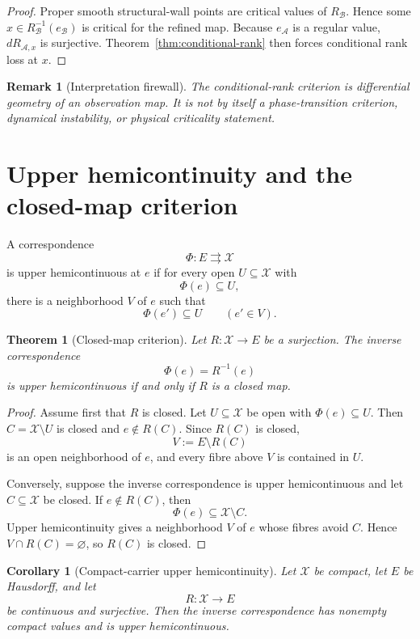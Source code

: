 \documentclass[11pt]{article}
\newtheorem{theorem}[definition]{Theorem}
\newtheorem{corollary}[definition]{Corollary}
\newtheorem{remark}[definition]{Remark}
\newcommand{\X}{\mathcal X}
\newcommand{\Acal}{\mathcal A}
\newcommand{\Bcal}{\mathcal B}
\begin{document}
\begin{proof}
Proper smooth structural-wall points are critical values of
\(R_{\Bcal}\). Hence some
\(x\in R_{\Bcal}^{-1}(e_{\Bcal})\) is critical for the refined map.
Because \(e_{\Acal}\) is a regular value, \(dR_{\Acal,x}\) is
surjective. Theorem~\ref{thm:conditional-rank} then forces conditional
rank loss at \(x\).
\end{proof}

\begin{remark}[Interpretation firewall]
The conditional-rank criterion is differential geometry of an observation
map. It is not by itself a phase-transition criterion, dynamical instability,
or physical criticality statement.
\end{remark}

\section{Upper hemicontinuity and the closed-map criterion}

A correspondence
\[
\Phi:E\rightrightarrows\X
\]
is upper hemicontinuous at \(e\) if for every open \(U\subseteq\X\) with
\[
\Phi(e)\subseteq U,
\]
there is a neighborhood \(V\) of \(e\) such that
\[
\Phi(e')\subseteq U
\qquad(e'\in V).
\]

\begin{theorem}[Closed-map criterion]
\label{thm:closed-map}
Let \(R:\X\to E\) be a surjection. The inverse correspondence
\[
\Phi(e)=R^{-1}(e)
\]
is upper hemicontinuous if and only if \(R\) is a closed map.
\end{theorem}

\begin{proof}
Assume first that \(R\) is closed. Let \(U\subseteq\X\) be open with
\(\Phi(e)\subseteq U\). Then \(C=\X\setminus U\) is closed and
\(e\notin R(C)\). Since \(R(C)\) is closed,
\[
V:=E\setminus R(C)
\]
is an open neighborhood of \(e\), and every fibre above \(V\) is contained
in \(U\).

Conversely, suppose the inverse correspondence is upper hemicontinuous and let
\(C\subseteq\X\) be closed. If \(e\notin R(C)\), then
\[
\Phi(e)\subseteq\X\setminus C.
\]
Upper hemicontinuity gives a neighborhood \(V\) of \(e\) whose fibres avoid
\(C\). Hence \(V\cap R(C)=\varnothing\), so \(R(C)\) is closed.
\end{proof}

\begin{corollary}[Compact-carrier upper hemicontinuity]
\label{thm:uhc}
Let \(\X\) be compact, let \(E\) be Hausdorff, and let
\[
R:\X\to E
\]
be continuous and surjective. Then the inverse correspondence has nonempty
compact values and is upper hemicontinuous.
\end{corollary}
\end{document}
